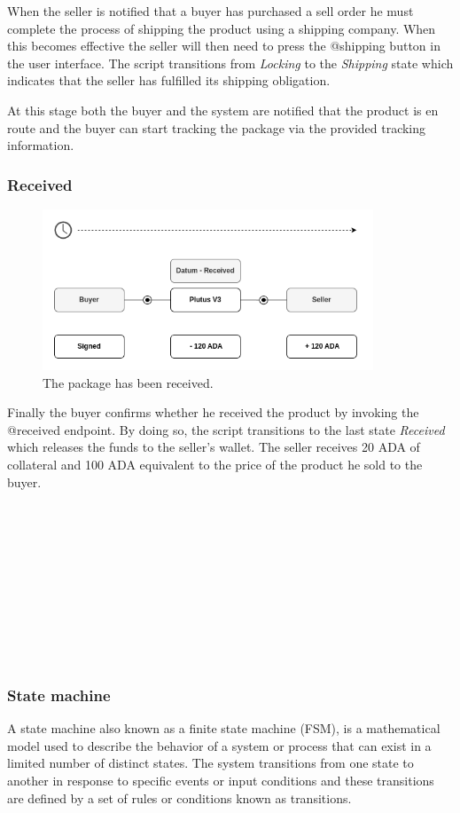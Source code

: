 \documentclass[12pt]{article}
\begin{document}
When the seller is notified that a buyer has purchased a sell order he must complete the process of shipping the product using a shipping company. When this becomes effective the seller will then need to press the @shipping button in the user interface.
The script transitions from \emph{Locking} to the \emph{Shipping} state which indicates that the seller has fulfilled its shipping obligation.

At this stage both the buyer and the system are notified that the product is en route and the buyer can start tracking the package via the provided tracking information.

\subsubsection { Received }

\begin{figure}[ht]
  \centering
  \includegraphics[width=0.88\textwidth, keepaspectratio]{4.png}
  \caption{The package has been received.}
  \label{fig:delivered}
\end{figure}

Finally the buyer confirms whether he received the product by invoking the @received endpoint. By doing so, the script transitions to the last state \emph{Received} which releases the funds to the seller's wallet. The seller receives 20 ADA of collateral and 100 ADA equivalent to the price of the product he sold to the buyer.
\\
\\
\\
\\
\\
\\
\\
\\
\\
\\
\\


\subsubsection { State machine }
A state machine also known as a finite state machine (FSM), is a mathematical model used to describe the behavior of a system or process that can exist in a limited number of distinct states. The system transitions from one state to another in response to specific events or input conditions and these transitions are defined by a set of rules or conditions known as transitions.
\end{document}
